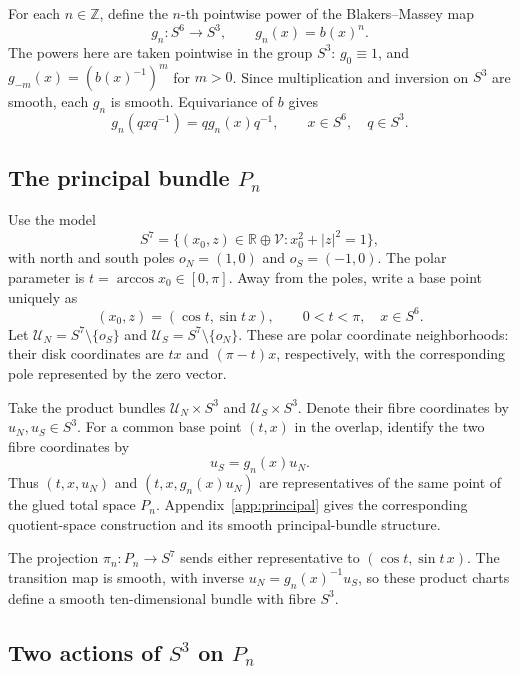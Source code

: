 \documentclass[12pt]{amsart}
\numberwithin{equation}{section}
\theoremstyle{remark}
\newcommand{\Rr}{\mathbb R}
\begin{document}
For each \(n\in\mathbb Z\), define the \(n\)-th pointwise power of the Blakers--Massey map
\[
 g_n:S^6\longrightarrow S^3,\qquad g_n(x)=b(x)^n.
\]
The powers here are taken pointwise in the group \(S^3\):
\(g_0\equiv1\), and \(g_{-m}(x)=(b(x)^{-1})^m\) for \(m>0\).
Since multiplication and inversion on \(S^3\) are smooth, each
\(g_n\) is smooth. Equivariance of \(b\) gives
\begin{equation}\label{eq:equiv}
g_n(qxq^{-1})=qg_n(x)q^{-1},
\qquad x\in S^6,\quad q\in S^3.
\end{equation}

\subsection{The principal bundle \texorpdfstring{\(P_n\)}{Pn}}
Use the model
\[
 S^7=\{(x_0,z)\in\Rr\oplus\mathcal V:x_0^2+|z|^2=1\},
\]
with north and south poles \(o_N=(1,0)\) and \(o_S=(-1,0)\).
The polar parameter is \(t=\arccos x_0\in[0,\pi]\). Away from
the poles, write a base point uniquely as
\[
 (x_0,z)=(\cos t,\sin t\,x),
 \qquad 0<t<\pi,\quad x\in S^6.
\]
Let \(\mathcal U_N=S^7\setminus\{o_S\}\) and
\(\mathcal U_S=S^7\setminus\{o_N\}\). These are polar coordinate
neighborhoods: their disk coordinates are \(t x\) and
\((\pi-t)x\), respectively, with the corresponding pole represented
by the zero vector.

Take the product bundles \(\mathcal U_N\times S^3\) and
\(\mathcal U_S\times S^3\). Denote their fibre coordinates by
\(u_N,u_S\in S^3\). For a common base point \((t,x)\) in the
overlap, identify the two fibre coordinates by
\begin{equation}\label{eq:principal}
u_S=g_n(x)u_N.
\end{equation}
Thus \((t,x,u_N)\) and \((t,x,g_n(x)u_N)\) are representatives of
the same point of the glued total space \(P_n\).
Appendix~\ref{app:principal} gives the corresponding quotient-space
construction and its smooth principal-bundle structure.

The projection
\(\pi_n:P_n\to S^7\) sends either representative to
\((\cos t,\sin t\,x)\). The transition map is smooth, with inverse
\(u_N=g_n(x)^{-1}u_S\), so these product charts define a smooth
ten-dimensional bundle with fibre \(S^3\).

\subsection{Two actions of \texorpdfstring{\(S^3\)}{S3} on \texorpdfstring{\(P_n\)}{Pn}}
\end{document}
